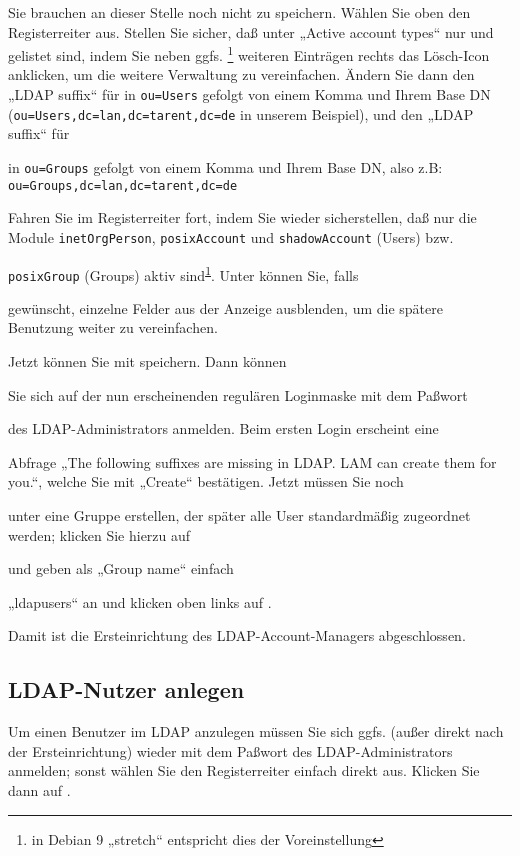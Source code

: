 \documentclass{tarentanleitung}
\begin{document}
\strut Sie brauchen an dieser Stelle noch nicht zu speichern. Wählen Sie
oben den Registerreiter  aus. Stellen
Sie sicher, daß unter „Active account types“ nur 
und  gelistet sind, indem Sie neben ggfs.%
\Hair\footnote{\label{fn:vor9}in Debian 9 „stretch“ entspricht dies der
Voreinstellung} weiteren Einträgen rechts das Lösch-Icon 
anklicken, um die weitere Verwaltung zu vereinfachen. Ändern Sie dann den
„LDAP suffix“ für  in \texttt{ou=Users} gefolgt
von einem Komma und Ihrem Base DN (\texttt{ou=Users,dc=lan,dc=tarent,dc=de}
in unserem Beispiel), und den „LDAP suffix“ für 
\strut in \texttt{ou=Groups} gefolgt von einem Komma und Ihrem Base DN, also
z.B: \texttt{ou=Groups,dc=lan,dc=tarent,dc=de}\strut

\strut Fahren Sie im Registerreiter  fort,
indem Sie wieder sicherstellen, daß nur die Module \texttt{inetOrgPerson},
\texttt{posixAccount} und \texttt{shadowAccount} (Users) bzw. \strut
\texttt{posixGroup} (Groups) aktiv sind\Hair\textsuperscript{\ref{fn:vor9}}.
Unter  können Sie, falls \strut
gewünscht, einzelne Felder aus der Anzeige ausblenden, um die spätere
Benutzung weiter zu vereinfachen.\strut

Jetzt können Sie mit  speichern. Dann können \strut
Sie sich auf der nun erscheinenden regulären Loginmaske mit dem Paßwort \strut
des LDAP-Administrators anmelden. Beim ersten Login erscheint eine \strut
Abfrage „The following suffixes are missing in LDAP. LAM can create them
for you.“, welche Sie mit „Create“ bestätigen. Jetzt müssen Sie noch \strut
unter  eine Gruppe erstellen, der später
alle User standardmäßig zugeordnet werden; klicken Sie hierzu auf \strut
{} und geben als „Group name“ einfach \strut
„ldapusers“ an und klicken oben links auf .

Damit ist die Ersteinrichtung des LDAP-Account-Managers abgeschlossen.

\subsection{LDAP-Nutzer anlegen}\label{subsec:setup-lam-adduser}

Um einen Benutzer im LDAP anzulegen müssen Sie sich ggfs. (außer direkt
nach der Ersteinrichtung) wieder mit dem Paßwort des LDAP-Administrators
anmelden; sonst wählen Sie den Registerreiter 
einfach direkt aus. Klicken Sie dann auf .
\end{document}

